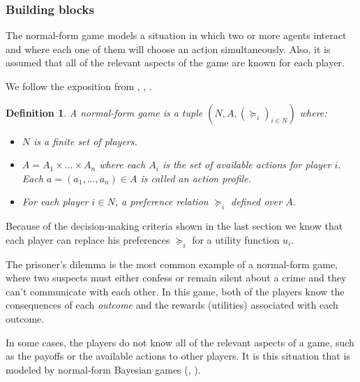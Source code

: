 \documentclass[11pt]{article}
\theoremstyle{plain}
\newtheorem{defi}[teo]{Definition}
\begin{document}
	\subsubsection{Building blocks}
	The normal-form game models a situation in which two or more agents interact and where each one of them will choose an action simultaneously. Also, it is assumed that all of the relevant aspects of the game are known for each player.
	
	We follow the exposition from \cite{osborne1994course}, \cite{binmore2007playing}, \cite{shoham2008multiagent}.
	
	\begin{defi}
	A normal-form game is a tuple $(N,A,(\succeq_i)_{i \in N})$ where:
	\begin{itemize}
	\item $N$ is a finite set of players.
	\item $A=A_1 \times ... \times A_n$ where each $A_i$ is the set of available actions for player $i$. Each $a=(a_1,...,a_n) \in A$ is called an action profile.
	\item For each player $i \in N$, a preference relation $\succeq_i$ defined over $A$.
	\end{itemize}
	\end{defi}

Because of the decision-making criteria shown in the last section we know that each player can replace his preferences $\succeq_i$ for a utility function $u_i$.

The prisoner's dilemma is the most common example of a normal-form game, where two suspects must either confess or remain silent about a crime and they can't communicate with each other. In this game, both of the players know the consequences of each \textit{outcome} and the rewards (utilities) associated with each outcome.

In some cases, the players do not know all of the relevant aspects of a game, such as the payoffs or the available actions to other players. It is this situation that is modeled by normal-form Bayesian games (\cite{osborne1994course}, \cite{shoham2008multiagent}).
\end{document}
